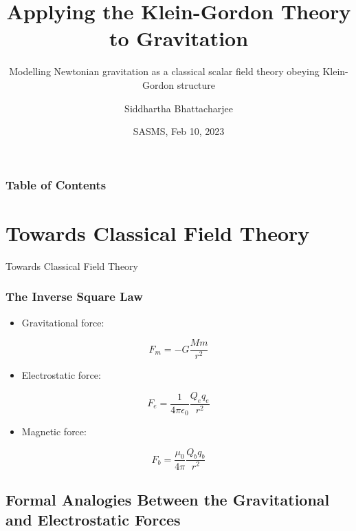 \documentclass{beamer}
\title{Applying the Klein-Gordon Theory to Gravitation}
\subtitle{Modelling Newtonian gravitation as a classical scalar field theory obeying Klein-Gordon structure}
\author{Siddhartha Bhattacharjee}
\institute
{
1B Mathematical Physics \\
University of Waterloo
}
\date{SASMS, Feb 10, 2023}
\begin{document}
\frame{\titlepage}

\begin{frame}
\frametitle{Table of Contents}
\tableofcontents
\end{frame}

\section{Towards Classical Field Theory}

\begin{frame}
\begin{center}
\Huge \textcolor{blue!50!gray}{Towards Classical Field Theory}
\end{center}
\end{frame}

\begin{frame}
\frametitle{The Inverse Square Law}

\begin{itemize}
\item Gravitational force:
\end{itemize}

$$F_m = - G \frac{M m}{r^2}$$

\begin{itemize}
\item Electrostatic force:
\end{itemize}

$$F_e = \frac{1}{4 \pi \epsilon_0} \frac{Q_e q_e}{r^2}$$

\begin{itemize}
\item Magnetic force:
\end{itemize}

$$F_b = \frac{\mu_0}{4 \pi} \frac{Q_b q_b}{r^2}$$
\end{frame}

\subsection{Formal Analogies Between the Gravitational and Electrostatic Forces}
\end{document}
